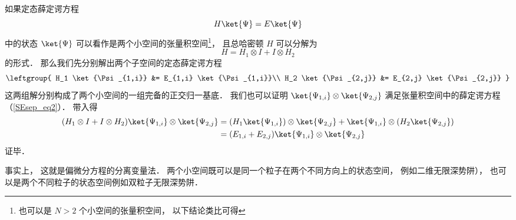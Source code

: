 
如果定态薛定谔方程
\begin{equation}\label{SEsep_eq2}
H \ket{\Psi} = E \ket{\Psi}
\end{equation}
中的状态 $\ket{\Psi}$ 可以看作是两个小空间的张量积空间\footnote{也可以是 $N > 2$ 个小空间的张量积空间， 以下结论类比可得}， 且总哈密顿 $H$ 可以分解为
\begin{equation}\label{SEsep_eq1}
H = H_1 \otimes I + I \otimes H_2
\end{equation}
的形式． 那么我们先分别解出两个子空间的定态薛定谔方程
\begin{equation}
\leftgroup{
H_1 \ket{\Psi_{1,i}} &= E_{1,i} \ket{\Psi_{1,i}}\\
H_2 \ket{\Psi_{2,j}} &= E_{2,j} \ket{\Psi_{2,j}}
}
\end{equation}
这两组解分别构成了两个小空间的一组完备的正交归一基底． 我们也可以证明 $\ket{\Psi_{1,i}} \otimes \ket{\Psi_{2,j}}$ 满足张量积空间中的薛定谔方程（\autoref{SEsep_eq2}）． 带入得
\begin{equation}
\begin{aligned}
(H_1 \otimes I + I \otimes H_2) \ket{\Psi_{1,i}} \otimes \ket{\Psi_{2,j}} &= (H_1 \ket{\Psi_{1,i}}) \otimes \ket{\Psi_{2,j}} +  \ket{\Psi_{1,i}} \otimes (H_2 \ket{\Psi_{2,j}})\\
&= (E_{1,i} + E_{2, j}) \ket{\Psi_{1,i}} \otimes \ket{\Psi_{2,j}}
\end{aligned}
\end{equation}
证毕．

事实上， 这就是偏微分方程的分离变量法． 两个小空间既可以是同一个粒子在两个不同方向上的状态空间， 例如二维无限深势阱）， 也可以是两个不同粒子的状态空间例如双粒子无限深势阱．%
